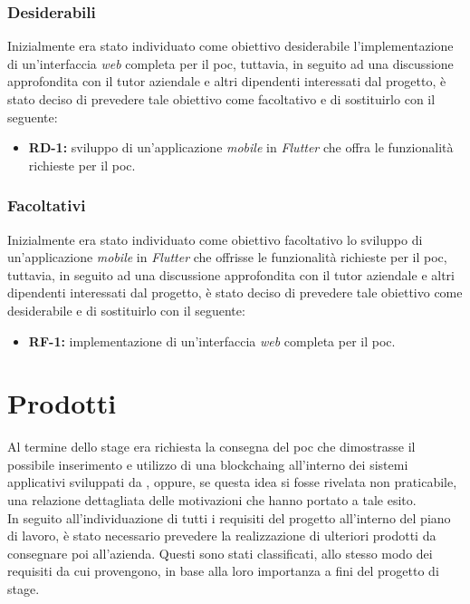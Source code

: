 \subsubsection*{Desiderabili}

Inizialmente era stato individuato come obiettivo desiderabile l'implementazione di un'interfaccia \textit{web} completa per il \gls{poc}, tuttavia, in seguito ad una discussione approfondita con il tutor aziendale e altri dipendenti interessati dal progetto, è stato deciso di prevedere tale obiettivo come facoltativo e di sostituirlo con il seguente:

\begin{itemize}
	\item \textbf{RD-1:} sviluppo di un'applicazione \textit{mobile} in \textit{Flutter} che offra le funzionalità richieste per il \gls{poc}.
\end{itemize}

\subsubsection*{Facoltativi}

Inizialmente era stato individuato come obiettivo facoltativo lo sviluppo di un'applicazione \textit{mobile} in \textit{Flutter} che offrisse le funzionalità richieste per il \gls{poc}, tuttavia, in seguito ad una discussione approfondita con il tutor aziendale e altri dipendenti interessati dal progetto, è stato deciso di prevedere tale obiettivo come desiderabile e di sostituirlo con il seguente:

\begin{itemize}
	\item \textbf{RF-1:} implementazione di un'interfaccia \textit{web} completa per il \gls{poc}.
\end{itemize} 

\section{Prodotti}

Al termine dello stage era richiesta la consegna del \gls{poc} che dimostrasse il possibile inserimento e utilizzo di una \gls{blockchaing} all'interno dei sistemi applicativi sviluppati da \myCompany{} \companyTitle, oppure, se questa idea si fosse rivelata non praticabile, una relazione dettagliata delle motivazioni che hanno portato a tale esito.\\
In seguito all'individuazione di tutti i requisiti del progetto all'interno del piano di lavoro, è stato necessario prevedere la realizzazione di ulteriori prodotti da consegnare poi all'azienda. Questi sono stati classificati, allo stesso modo dei requisiti da cui provengono, in base alla loro importanza a fini del progetto di stage.

